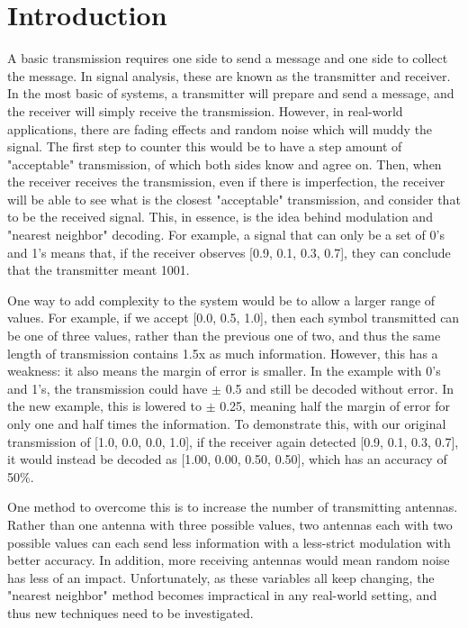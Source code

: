 \documentclass[conference]{IEEEtran}
\begin{document}
\IEEEpeerreviewmaketitle

\section{Introduction}
A basic transmission requires one side to send a message and one side to collect the message. In signal analysis, these are known as the transmitter and receiver. In the most basic of systems, a transmitter will prepare and send a message, and the receiver will simply receive the transmission. However, in real-world applications, there are fading effects and random noise which will muddy the signal. The first step to counter this would be to have a step amount of "acceptable" transmission, of which both sides know and agree on. Then, when the receiver receives the transmission, even if there is imperfection, the receiver will be able to see what is the closest "acceptable" transmission, and consider that to be the received signal. This, in essence, is the idea behind modulation and "nearest neighbor" decoding. For example, a signal that can only be a set of 0's and 1's means that, if the receiver observes [0.9, 0.1, 0.3, 0.7], they can conclude that the transmitter meant 1001. \par
One way to add complexity to the system would be to allow a larger range of values. For example, if we accept [0.0, 0.5, 1.0], then each symbol transmitted can be one of three values, rather than the previous one of two, and thus the same length of transmission contains 1.5x as much information. However, this has a weakness: it also means the margin of error is smaller. In the example with 0's and 1's, the transmission could have $\pm$ 0.5 and still be decoded without error. In the new example, this is lowered to $\pm$ 0.25, meaning half the margin of error for only one and half times the information. To demonstrate this, with our original transmission of [1.0, 0.0, 0.0, 1.0], if the receiver again detected [0.9, 0.1, 0.3, 0.7], it would instead be decoded as [1.00, 0.00, 0.50, 0.50], which has an accuracy of 50\%.\par
One method to overcome this is to increase the number of transmitting antennas. Rather than one antenna with three possible values, two antennas each with two possible values can each send less information with a less-strict modulation with better accuracy. In addition, more receiving antennas would mean random noise has less of an impact. Unfortunately, as these variables all keep changing, the "nearest neighbor" method becomes impractical in any real-world setting, and thus new techniques need to be investigated.\par
\end{document}
